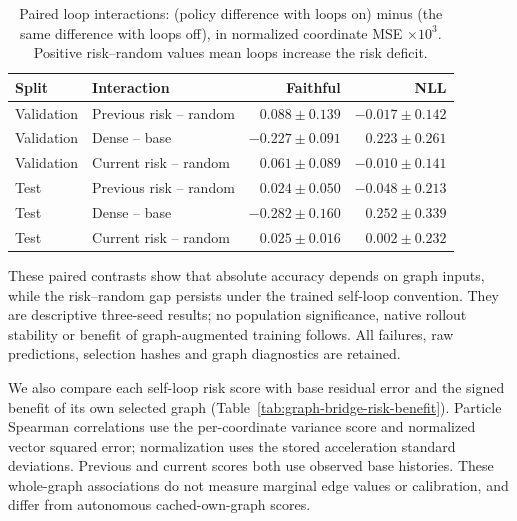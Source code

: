 \begin{table}[ht]
\centering\small
\caption{Paired loop interactions: (policy difference with loops on) minus
(the same difference with loops off), in normalized coordinate MSE $\times10^3$.
Positive risk--random values mean loops increase the risk deficit.}
\label{tab:graph-loop-interactions}
\begin{tabular}{llrr}
\toprule
Split & Interaction & Faithful & NLL\\
\midrule
Validation & Previous risk -- random & $0.088\pm0.139$ & $-0.017\pm0.142$\\
Validation & Dense -- base & $-0.227\pm0.091$ & $0.223\pm0.261$\\
Validation & Current risk -- random & $0.061\pm0.089$ & $-0.010\pm0.141$\\
Test & Previous risk -- random & $0.024\pm0.050$ & $-0.048\pm0.213$\\
Test & Dense -- base & $-0.282\pm0.160$ & $0.252\pm0.339$\\
Test & Current risk -- random & $0.025\pm0.016$ & $0.002\pm0.232$\\
\bottomrule
\end{tabular}
\end{table}

These paired contrasts show that absolute accuracy depends on graph inputs,
while the risk--random gap persists under the trained self-loop convention.
They are descriptive three-seed results; no population significance, native
rollout stability or benefit of graph-augmented training follows. All failures,
raw predictions, selection hashes and graph diagnostics are retained.


We also compare each self-loop risk score with base residual error and the signed benefit of its own selected graph (Table~\ref{tab:graph-bridge-risk-benefit}). Particle Spearman correlations use the per-coordinate variance score and normalized vector squared error; normalization uses the stored acceleration standard deviations. Previous and current scores both use observed base histories. These whole-graph associations do not measure marginal edge values or calibration, and differ from autonomous cached-own-graph scores.

